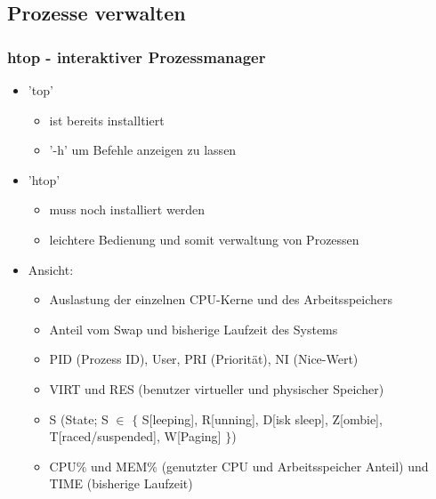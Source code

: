 \documentclass[12pt,utf8]{beamer}
\begin{document}
\subsection{Prozesse verwalten}
\begin{frame}
\frametitle{htop - interaktiver Prozessmanager}
\begin{itemize}
	\item 'top'
	\begin{itemize}[<+->]
		\item ist bereits installtiert
		\item '-h' um Befehle anzeigen zu lassen
	\end{itemize}
	\item 'htop'
	\begin{itemize}[<+->]
		\item muss noch installiert werden
		\item leichtere Bedienung und somit verwaltung von Prozessen
	\end{itemize}
	\item Ansicht:
	\begin{itemize}[<+->]
		\item Auslastung der einzelnen CPU-Kerne und des Arbeitsspeichers
		\item Anteil vom Swap und bisherige Laufzeit des Systems
		\item PID (Prozess ID), User, PRI (Priorität), NI (Nice-Wert)
		\item VIRT und RES (benutzer virtueller und physischer Speicher)
		\item S (State; S $\in$ $\{$ S[leeping], R[unning], D[isk sleep], Z[ombie], T[raced/suspended], W[Paging] $\}$)
		\item CPU$\%$ und MEM$\%$ (genutzter CPU und Arbeitsspeicher Anteil) und TIME (bisherige Laufzeit)
	\end{itemize}
\end{itemize}
\end{frame}
\end{document}
